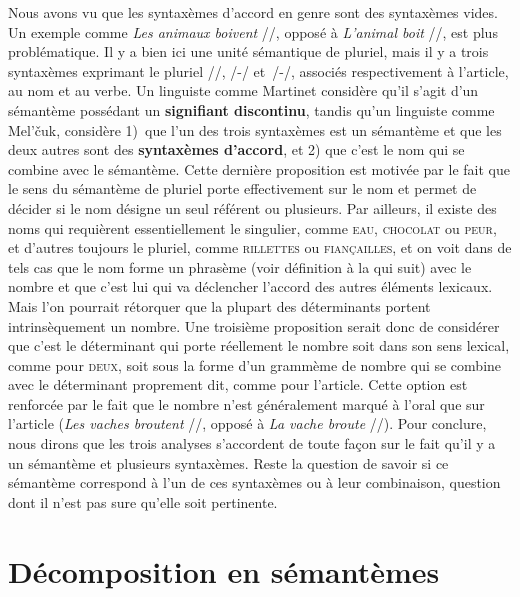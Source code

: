 {    Nous avons vu que les syntaxèmes d’accord en genre sont des syntaxèmes vides. Un exemple comme \textit{Les animaux boivent} //, opposé à \textit{L’animal boit} //, est plus problématique. Il y a bien ici une unité sémantique de pluriel, mais il y a trois syntaxèmes exprimant le pluriel //, /-/ et~/-/, associés respectivement à l’article, au nom et au verbe. Un linguiste comme Martinet considère qu’il s’agit d’un sémantème possédant un \textbf{signifiant discontinu}, tandis qu’un linguiste comme Mel’čuk, considère 1)~que l’un des trois syntaxèmes est un sémantème et que les deux autres sont des \textbf{syntaxèmes d’accord}, et 2) que c’est le nom qui se combine avec le sémantème. Cette dernière proposition est motivée par le fait que le sens du sémantème de pluriel porte effectivement sur le nom et permet de décider si le nom désigne un seul référent ou plusieurs. Par ailleurs, il existe des noms qui requièrent essentiellement le singulier, comme \textsc{eau}, \textsc{chocolat} ou \textsc{peur}, et d’autres toujours le pluriel, comme \textsc{rillettes} ou \textsc{fiançailles}, et on voit dans de tels cas que le nom forme un phrasème (voir définition à la  qui suit) avec le nombre et que c’est lui qui va déclencher l’accord des autres éléments lexicaux. Mais l’on pourrait rétorquer que la plupart des déterminants portent intrinsèquement un nombre. Une troisième proposition serait donc de considérer que c’est le déterminant qui porte réellement le nombre soit dans son sens lexical, comme pour \textsc{deux}, soit sous la forme d’un grammème de nombre qui se combine avec le déterminant proprement dit, comme pour l’article. Cette option est renforcée par le fait que le nombre n’est généralement marqué à l’oral que sur l’article (\textit{Les vaches broutent} //, opposé à \textit{La vache broute} //). Pour conclure, nous dirons que les trois analyses s’accordent de toute façon sur le fait qu’il y a un sémantème et plusieurs syntaxèmes. Reste la question de savoir si ce sémantème correspond à l’un de ces syntaxèmes ou à leur combinaison, question dont il n’est pas sure qu’elle soit pertinente.
}
\section{Décomposition en sémantèmes}\label{sec:2.3.5}

